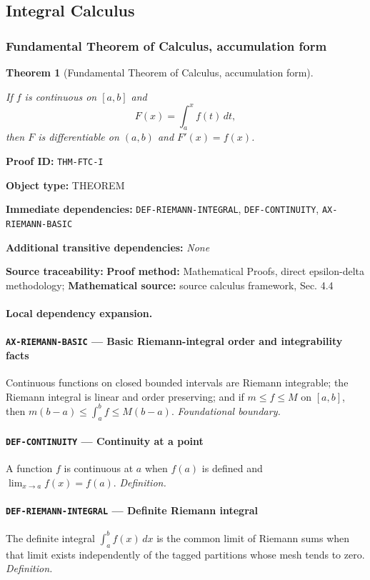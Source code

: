 \documentclass[10pt]{article}
\newcommand{\pidraw}[1]{\begingroup\urlstyle{tt}\nolinkurl{#1}\endgroup}
\newtheorem{theorem}{Theorem}[section]
\theoremstyle{definition}
\theoremstyle{remark}
\newcommand{\meta}[2]{\noindent\textbf{#1:} #2\par}
\begin{document}
\subsection{Integral Calculus}

\subsubsection{Fundamental Theorem of Calculus, accumulation form}

\begin{theorem}[Fundamental Theorem of Calculus, accumulation form]\label{prf:THM-FTC-I}

If $f$ is continuous on $[a,b]$ and
\[
F(x)=\int_a^x f(t)\,dt,
\]
then $F$ is differentiable on $(a,b)$ and $F'(x)=f(x)$.

\end{theorem}

\meta{Proof ID}{\pidraw{THM-FTC-I}}
\meta{Object type}{THEOREM}
\meta{Immediate dependencies}{\pidraw{DEF-RIEMANN-INTEGRAL}, \pidraw{DEF-CONTINUITY}, \pidraw{AX-RIEMANN-BASIC}}
\meta{Additional transitive dependencies}{\emph{None}}
\meta{Source traceability}{\textbf{Proof method:} Mathematical Proofs, direct epsilon-delta methodology; \textbf{Mathematical source:} source calculus framework, Sec. 4.4}

\paragraph{Local dependency expansion.}

\paragraph{\pidraw{AX-RIEMANN-BASIC} --- Basic Riemann-integral order and integrability facts}
Continuous functions on closed bounded intervals are Riemann integrable; the Riemann integral is linear and order preserving; and if $m\le f\le M$ on $[a,b]$, then $m(b-a)\le\int_a^b f\le M(b-a)$.
\textit{Foundational boundary.}

\paragraph{\pidraw{DEF-CONTINUITY} --- Continuity at a point}
A function $f$ is continuous at $a$ when $f(a)$ is defined and $\lim_{x\to a}f(x)=f(a)$.
\textit{Definition.}

\paragraph{\pidraw{DEF-RIEMANN-INTEGRAL} --- Definite Riemann integral}
The definite integral $\int_a^b f(x)\,dx$ is the common limit of Riemann sums when that limit exists independently of the tagged partitions whose mesh tends to zero.
\textit{Definition.}
\end{document}
